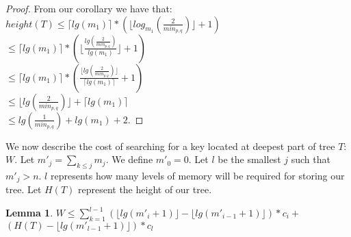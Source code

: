 \documentclass[letterpaper,12pt,titlepage,oneside,final]{book}
\theoremstyle{plain}
\newtheorem{lem}[thm]{Lemma}
\begin{document}
\begin{proof}
From our corollary we have that:\\
$height(T) \leq \lceil lg(m_1) \rceil * (\lfloor log_{m_1}(\frac{2}{min_{p,q}}) \rfloor + 1)$ \\

$ \leq \lceil lg(m_1) \rceil * (\lfloor \frac{lg(\frac{2}{min_{p,q}})}{lg(m_1)} \rfloor + 1)$\\

$ \leq \lceil lg(m_1) \rceil * ( \frac{ \lfloor lg(\frac{2}{min_{p,q}}) \rfloor}{\lceil lg(m_1) \rceil} + 1)$\\

$ \leq  \lfloor lg(\frac{2}{min_{p,q}}) \rfloor + \lceil lg(m_1) \rceil$\\

$ \leq  lg(\frac{1}{min_{p,q}}) + lg(m_1) + 2$.

\end{proof}

\fi

We now describe the cost of searching for a key located at deepest part of tree $T$: $W$. Let $m'_j = \sum_{k \leq j} m_j$. We define $m'_0 = 0$. Let $l$ be the smallest $j$ such that $m'_j > n$. $l$ represents how many levels of memory will be required for storing our tree. Let $H(T)$ represent the height of our tree.

\iffalse
\begin{lem} \hspace{1cm} \\
$W \leq \sum_{k=1}^{l-1} (\lfloor lg(m'_i+1) \rfloor - \lfloor lg(m'_{i-1}+1) \rfloor)*c_i$\\ $+ (lg(\frac{1}{min_{p,q}}) + lg(m_1) + 2 - \lfloor lg(m'_{l-1}+1) \rfloor)*c_l$ THIS USES THE OLD HEIGHT
\end{lem}
\fi

\begin{lem} 
$W \leq \sum_{k=1}^{l-1} (\lfloor lg(m'_i+1) \rfloor - \lfloor lg(m'_{i-1}+1) \rfloor)*c_i+$\\  $ (H(T) - \lfloor lg(m'_{l-1}+1) \rfloor)*c_l$
\end{lem}
\end{document}

